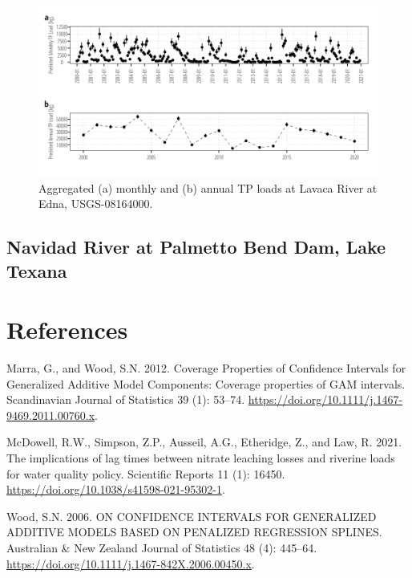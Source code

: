 \documentclass[
]{article}
\newlength{\cslhangindent}
\newlength{\cslentryspacingunit} %
\newenvironment{CSLReferences}[2] %
 {%
  \setlength{\parindent}{0pt}
  \ifodd #1
  \let\oldpar\par
  \def\par{\hangindent=\cslhangindent\oldpar}
  \fi
  \setlength{\parskip}{#2\cslentryspacingunit}
 }%
 {}
\begin{document}
\begin{figure}[h]

{\centering \includegraphics{load_estimates_files/figure-pdf/tp_aggregate-08164000-1.png}

}

\caption{Aggregated (a) monthly and (b) annual TP loads at Lavaca River
at Edna, USGS-08164000.}

\end{figure}

\hypertarget{navidad-river-at-palmetto-bend-dam-lake-texana}{%
\subsection{Navidad River at Palmetto Bend Dam, Lake
Texana}\label{navidad-river-at-palmetto-bend-dam-lake-texana}}

\clearpage

\hypertarget{references}{%
\section*{References}\label{references}}

\hypertarget{refs}{}
\begin{CSLReferences}{1}{0}
\leavevmode{}%
Marra, G., and Wood, S.N. 2012. Coverage Properties of Confidence
Intervals for Generalized Additive Model Components: Coverage properties
of GAM intervals. Scandinavian Journal of Statistics 39 (1): 53--74.
\url{https://doi.org/10.1111/j.1467-9469.2011.00760.x}.

\leavevmode{}%
McDowell, R.W., Simpson, Z.P., Ausseil, A.G., Etheridge, Z., and Law, R.
2021. The implications of lag times between nitrate leaching losses and
riverine loads for water quality policy. Scientific Reports 11 (1):
16450. \url{https://doi.org/10.1038/s41598-021-95302-1}.

\leavevmode{}%
Wood, S.N. 2006. ON CONFIDENCE INTERVALS FOR GENERALIZED ADDITIVE MODELS
BASED ON PENALIZED REGRESSION SPLINES. Australian \& New Zealand Journal
of Statistics 48 (4): 445--64.
\url{https://doi.org/10.1111/j.1467-842X.2006.00450.x}.

\end{CSLReferences}
\end{document}
